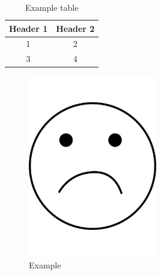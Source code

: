\documentclass{article}
\begin{document}
\begin{table}[h]
\centering
\begin{tabular}{|c|c|}
\hline
Header 1 & Header 2 \\ \hline
1 & 2 \\ \hline
3 & 4 \\ \hline
\end{tabular}
\caption{Example table}
\label{tab:example}
\end{table}


\begin{figure}[h]
\centering
\includegraphics[width=0.5\textwidth]{example.png}
\caption{Example}
\label{fig:example}
\end{figure}
\end{document}

